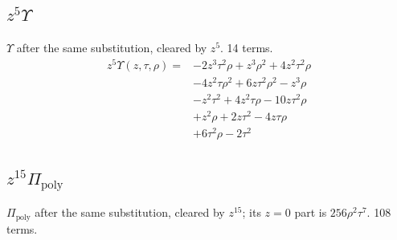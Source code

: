 \subsection*{$z^5\Upsilon$}
$\Upsilon$ after the same substitution, cleared by $z^5$. 14 terms.
{\small
\begin{align*}
z^5\Upsilon(z,\tau,\rho)={}&-2z^{3} \tau^{2} \rho+z^{3} \rho^{2}+4z^{2} \tau^{2} \rho\\
&-4z^{2} \tau \rho^{2}+6z \tau^{2} \rho^{2}-z^{3} \rho\\
&-z^{2} \tau^{2}+4z^{2} \tau \rho-10z \tau^{2} \rho\\
&+z^{2} \rho+2z \tau^{2}-4z \tau \rho\\
&+6\tau^{2} \rho-2\tau^{2}
\end{align*}
}

\subsection*{$z^{15}\Pi_{\mathrm{poly}}$}
$\Pi_{\mathrm{poly}}$ after the same substitution, cleared by $z^{15}$; its $z=0$ part is $256\rho^2\tau^7$. 108 terms.

